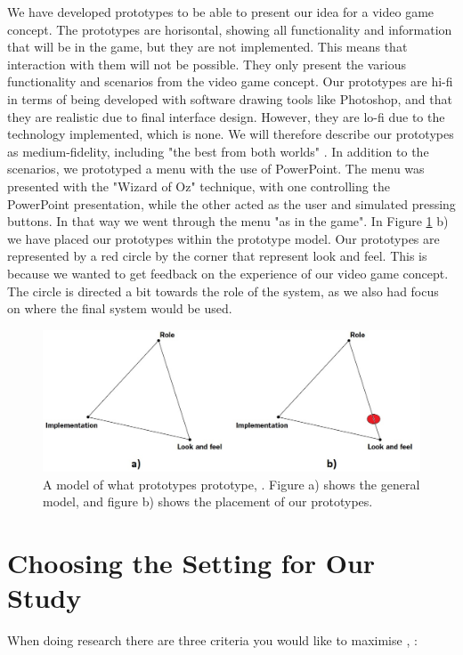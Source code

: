 We have developed prototypes to be able to present our idea for a video game concept. The prototypes are horisontal, showing all functionality and information that will be in the game, but they are not implemented. This means that interaction with them will not be possible. They only present the various functionality and scenarios from the video game concept. Our prototypes are hi-fi in terms of being developed with software drawing tools like Photoshop, and that they are realistic due to final interface design. However, they are lo-fi due to the technology implemented, which is none. We will therefore describe our prototypes as medium-fidelity, including "the best from both worlds" \cite{mediumfidelity}. In addition to the scenarios, we prototyped a menu with the use of PowerPoint. The menu was presented with the "Wizard of Oz" technique, with one controlling the PowerPoint presentation, while the other acted as the user and simulated pressing buttons. In that way we went through the menu "as in the game". In Figure \ref{fig:prototype} b) we have placed our prototypes within the prototype model. Our prototypes are represented by a red circle by the corner that represent look and feel. This is because we wanted to get feedback on the experience of our video game concept. The circle is directed a bit towards the role of the system, as we also had focus on where the final system would be used. 

\begin{figure} [H]
\centering
\includegraphics[scale=0.4]{prototypemodelDobbel.jpg}
\caption[Prototype model]{A model of what prototypes prototype, \cite{houde1997prototypes}. Figure a) shows the general model, and figure b) shows the placement of our prototypes.}
\label{fig:prototype}
\end{figure}

\section{Choosing the Setting for Our Study}
\label{sec:experimental}
When doing research there are three criteria you would like to maximise \cite{McGrath}, \cite{alsos}: 

